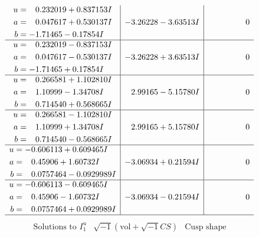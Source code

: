 \documentclass[1p]{elsarticle_modified}
\theoremstyle{definition}
\newcommand{\I}{\sqrt{-1}}
\begin{document}
$$\begin{array}{c|c|c}
\begin{aligned}
u &= \phantom{-}0.232019 + 0.837153 I \\
a &= \phantom{-}0.047617 + 0.530137 I \\
b &= -1.71465 - 0.17854 I\end{aligned}
 & -3.26228 - 3.63513 I & \phantom{-0.000000 } 0 \\ \hline\begin{aligned}
u &= \phantom{-}0.232019 - 0.837153 I \\
a &= \phantom{-}0.047617 - 0.530137 I \\
b &= -1.71465 + 0.17854 I\end{aligned}
 & -3.26228 + 3.63513 I & \phantom{-0.000000 } 0 \\ \hline\begin{aligned}
u &= \phantom{-}0.266581 + 1.102810 I \\
a &= \phantom{-}1.10999 - 1.34708 I \\
b &= \phantom{-}0.714540 + 0.568665 I\end{aligned}
 & \phantom{-}2.99165 - 5.15780 I & \phantom{-0.000000 } 0 \\ \hline\begin{aligned}
u &= \phantom{-}0.266581 - 1.102810 I \\
a &= \phantom{-}1.10999 + 1.34708 I \\
b &= \phantom{-}0.714540 - 0.568665 I\end{aligned}
 & \phantom{-}2.99165 + 5.15780 I & \phantom{-0.000000 } 0 \\ \hline\begin{aligned}
u &= -0.606113 + 0.609465 I \\
a &= \phantom{-}0.45906 + 1.60732 I \\
b &= \phantom{-}0.0757464 - 0.0929989 I\end{aligned}
 & -3.06934 + 0.21594 I & \phantom{-0.000000 } 0 \\ \hline\begin{aligned}
u &= -0.606113 - 0.609465 I \\
a &= \phantom{-}0.45906 - 1.60732 I \\
b &= \phantom{-}0.0757464 + 0.0929989 I\end{aligned}
 & -3.06934 - 0.21594 I & \phantom{-0.000000 } 0\\
 \hline 
 \end{array}$$\newpage$$\begin{array}{c|c|c}  
\text{Solutions to }I^u_{1}& \I (\text{vol} + \sqrt{-1}CS) & \text{Cusp shape}\\

\end{array}$$
\end{document}
